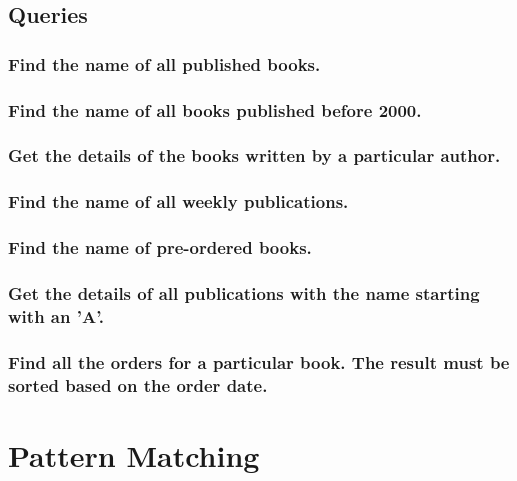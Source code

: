 \documentclass{report}
\begin{document}
\section{Queries}

\subsection{Find the name of all published books.}
\subsection{Find the name of all books published before 2000.}
\subsection{Get the details of the books written by a particular author.}
\subsection{Find the name of all weekly publications. }
\subsection{Find the name of pre-ordered books.}
\subsection{Get the details of all publications with the name starting with an 'A'.}
\subsection{Find all the orders for a particular book. The result must be sorted based on the order date. }

\chapter{Pattern Matching}
\end{document}
